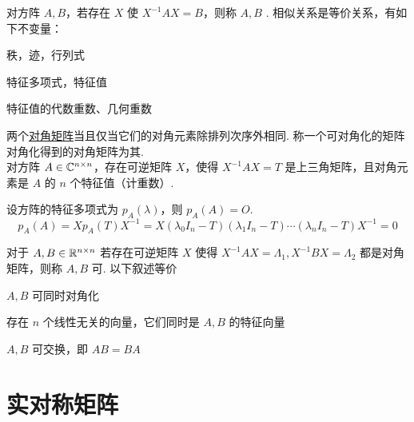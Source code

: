 \documentclass[./main.tex]{subfiles}
\begin{document}
对方阵 $A,B$，若存在 $X$ 使 $X^{-1}AX=B$，则称 $A,B$ . 相似关系是等价关系，有如下不变量：
\begin{enumerate*}
    \item 秩，迹，行列式
    \item 特征多项式，特征值
    \item 特征值的代数重数、几何重数
\end{enumerate*}

两个\underline{对角矩阵}当且仅当它们的对角元素除排列次序外相同. 称一个可对角化的矩阵对角化得到的对角矩阵为其.\\

对方阵 $A\in\mathbb{C}^{n\times n}$，存在可逆矩阵 $X$，使得 $X^{-1}AX=T$ 是上三角矩阵，且对角元素是 $A$ 的 $n$ 个特征值（计重数）.

设方阵的特征多项式为 $p_A(\lambda)$，则 $p_A(A)=O$.
$$p_A(A)=Xp_A(T)X^{-1}=X(\lambda_0 I_n-T)(\lambda_1 I_n-T)\cdots(\lambda_n I_n-T)X^{-1}=0$$

对于 $A,B\in\mathbb{R}^{n\times n}$ 若存在可逆矩阵 $X$ 使得 $X^{-1}AX=\Lambda_1,X^{-1}BX=\Lambda_2$ 都是对角矩阵，则称 $A,B$ 可. 以下叙述等价
\begin{enumerate*}
    \item $A,B$ 可同时对角化
    \item 存在 $n$ 个线性无关的向量，它们同时是 $A,B$ 的特征向量
    \item $A,B$ 可交换，即 $AB=BA$
\end{enumerate*}

\section{实对称矩阵}
\end{document}
